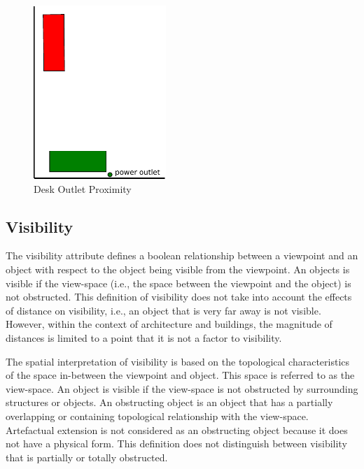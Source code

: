 \documentclass[12pt]{ucthesis}
\begin{document}
\begin{figure}[H]
 \centering
 \includegraphics[width=50mm]{desk-proximity}
 \caption{Desk Outlet Proximity}
\label{desk-proximity}
\end{figure}

\subsection{Visibility}
The visibility attribute defines a boolean relationship between a viewpoint and an object with respect to the object being visible from the viewpoint. An objects is visible if the view-space (i.e., the space between the viewpoint and the object) is not obstructed. This definition of visibility does not take into account the effects of distance on visibility, i.e., an object that is very far away is not visible. However, within the context of architecture and buildings, the magnitude of distances is limited to a point that it is not a factor to visibility.

The spatial interpretation of visibility is based on the topological characteristics of the space in-between the viewpoint and object. This space is referred to as the view-space. An object is visible if the view-space is not obstructed by surrounding structures or objects. An obstructing object is an object that has a partially overlapping or containing topological relationship with the view-space. Artefactual extension is not considered as an obstructing object because it does not have a physical form. This definition does not distinguish between visibility that is partially or totally obstructed.
\end{document}
